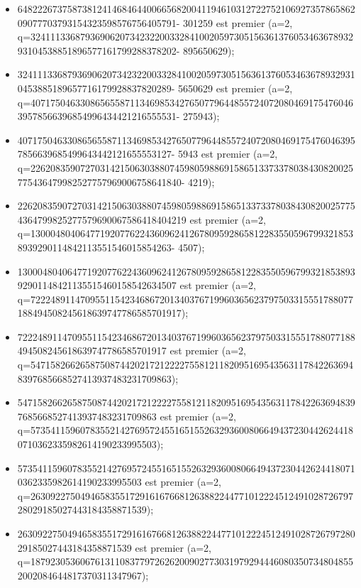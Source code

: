 \documentclass{article}
\begin{document}
\begin{itemize}
    \item 6482226737587381241468464400665682004119461031272275210692735786586209077703793154323598576756405791- 301259 est premier (a=2, \\q=3241113368793690620734232200332841002059730515636137605346367893293104538851896577161799288378202- 895650629);
\item 324111336879369062073423220033284100205973051563613760534636789329310453885189657716179928837820289- 5650629 est premier (a=2, \\q=4071750463308656558711346985342765077964485572407208046917547604639578566396854996434421216555531- 275943);
\item 407175046330865655871134698534276507796448557240720804691754760463957856639685499643442121655553127- 5943 est premier (a=2, \\q=22620835907270314215063038807459805988691586513373378038430820025775436479982527757969006758641840- 4219);
\item 226208359072703142150630388074598059886915865133733780384308200257754364799825277579690067586418404219 est premier (a=2, \\q=130004804064771920776224360962412678095928658122835505967993218538939290114842113551546015854263- 4507);
\item 1300048040647719207762243609624126780959286581228355059679932185389392901148421135515460158542634507 est premier (a=2,\\ q=72224891147095511542346867201340376719960365623797503315551788077188494508245618639747786585701917);
\item 72224891147095511542346867201340376719960365623797503315551788077188494508245618639747786585701917 est premier (a=2, \\q=547158266265875087442021721222275581211820951695435631178422636948397685668527413937483231709863);
\item 547158266265875087442021721222275581211820951695435631178422636948397685668527413937483231709863 est premier (a=2,\\ q=573541159607835521427695724551651552632936008066494372304426244180710362335982614190233995503);
\item 573541159607835521427695724551651552632936008066494372304426244180710362335982614190233995503 est premier (a=2,\\ q=2630922750494658355172916167668126388224477101222451249102872679728029185027443184358871539);
\item 2630922750494658355172916167668126388224477101222451249102872679728029185027443184358871539 est premier (a=2,\\ q=187923053606761311083779726262009027730319792944460803507348048552002084644817370311347967);

\end{itemize}
\end{document}
